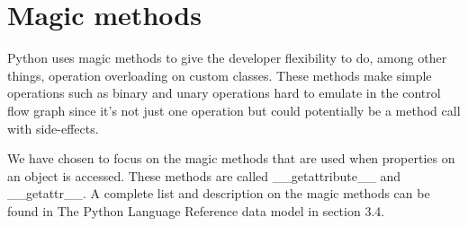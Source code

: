 \section{Magic methods}
Python uses magic methods to give the developer flexibility to do, among other things, operation overloading on custom classes. These methods make simple operations such as binary and unary operations hard to emulate in the control flow graph since it's not just one operation but could potentially be a method call with side-effects.

We have chosen to focus on the magic methods that are used when properties on an object is accessed. These methods are called \_\_getattribute\_\_ and \_\_getattr\_\_. A complete list and description on the magic methods can be found in The Python Language Reference data model\cite{pyref.datamodel} in section 3.4.
